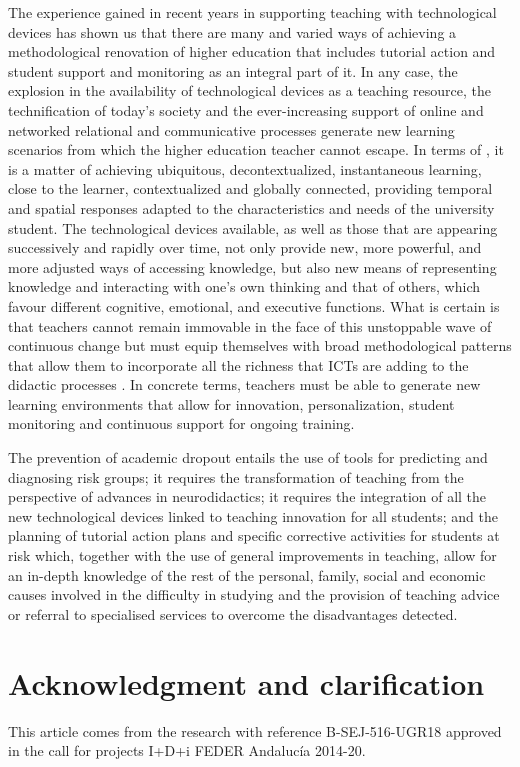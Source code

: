\documentclass[english]{textolivre}
\begin{document}
The experience gained in recent years in supporting teaching with technological devices has shown us that there are many and varied ways of achieving a methodological renovation of higher education that includes tutorial action and student support and monitoring as an integral part of it. In any case, the explosion in the availability of technological devices as a teaching resource, the technification of today's society and the ever-increasing support of online and networked relational and communicative processes generate new learning scenarios from which the higher education teacher cannot escape. In terms of \textcite{barroso-osuna_visiones_2020}, it is a matter of achieving ubiquitous, decontextualized, instantaneous learning, close to the learner, contextualized and globally connected, providing temporal and spatial responses adapted to the characteristics and needs of the university student. The technological devices available, as well as those that are appearing successively and rapidly over time, not only provide new, more powerful, and more adjusted ways of accessing knowledge, but also new means of representing knowledge and interacting with one's own thinking and that of others, which favour different cognitive, emotional, and executive functions. What is certain is that teachers cannot remain immovable in the face of this unstoppable wave of continuous change but must equip themselves with broad methodological patterns that allow them to incorporate all the richness that ICTs are adding to the didactic processes \cite{chavez_neurodidactica_2020}. In concrete terms, teachers must be able to generate new learning environments that allow for innovation, personalization, student monitoring and continuous support for ongoing training.

The prevention of academic dropout entails the use of tools for predicting and diagnosing risk groups; it requires the transformation of teaching from the perspective of advances in neurodidactics; it requires the integration of all the new technological devices linked to teaching innovation for all students; and the planning of tutorial action plans and specific corrective activities for students at risk which, together with the use of general improvements in teaching, allow for an in-depth knowledge of the rest of the personal, family, social and economic causes involved in the difficulty in studying and the provision of teaching advice or referral to specialised services to overcome the disadvantages detected.


\section{Acknowledgment and clarification}\label{sec-conclusao}
This article comes from the research with reference B-SEJ-516-UGR18 approved in the call for projects I+D+i FEDER Andalucía 2014-20.
\end{document}
